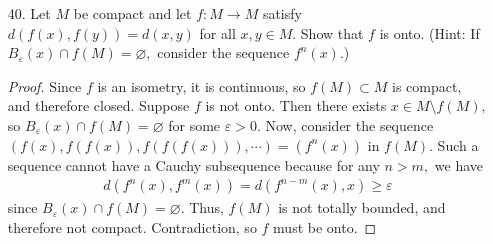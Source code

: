 \documentclass{article}
\begin{document}
\begin{itemize}
	\item[40.] Let $M$ be compact and let $f:M\to M$ satisfy $d(f(x), f(y))=d(x, y)$ for all $x, y\in M.$ Show that $f$ is onto. (Hint: If $B_\varepsilon(x)\cap f(M)=\varnothing,$ consider the sequence $f^n(x).$)
		\begin{proof}
			Since $f$ is an isometry, it is continuous, so $f(M)\subset M$ is compact, and therefore closed. Suppose $f$ is not onto. Then there exists $x\in M\setminus f(M),$ so $B_\varepsilon(x)\cap f(M)=\varnothing$ for some $\varepsilon>0.$ Now, consider the sequence $(f(x), f(f(x)), f(f(f(x))), \cdots)=(f^n(x))$ in $f(M).$ Such a sequence cannot have a Cauchy subsequence because for any $n>m,$ we have
			\begin{align*}
				d(f^n(x), f^m(x)) = d(f^{n-m}(x), x) \ge \varepsilon
			\end{align*}
			since $B_\varepsilon(x)\cap f(M)=\varnothing.$ Thus, $f(M)$ is not totally bounded, and therefore not compact. Contradiction, so $f$ must be onto.
		\end{proof}
		
\end{itemize}
\end{document}
